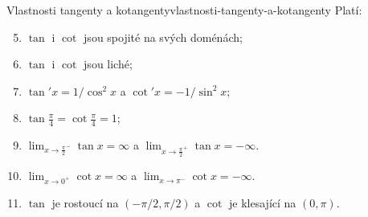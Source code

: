 \begin{proposition}{Vlastnosti tangenty a kotangenty}{vlastnosti-tangenty-a-kotangenty}
 Platí:
 \begin{enumerate}[label=(G\arabic*)]
  \setcounter{enumi}{4}
  \item $\tan$ i $\cot$ jsou spojité na svých doménách;
  \item $\tan$ i $\cot$ jsou liché;
  \item $\tan'x = 1 / \cos^2 x$ a $\cot'x = - 1 / \sin^2 x$;
  \item $\tan \frac{\pi}{4} = \cot \frac{\pi}{4} = 1$;
  \item $\lim_{x \to \frac{\pi}{2}^{-}} \tan x = \infty$ a $\lim_{x \to
   \frac{\pi}{2}^{+}} \tan x = -\infty$.
  \item $\lim_{x \to 0^{+}} \cot x = \infty$ a $\lim_{x \to \pi^{-}} \cot x =
   -\infty$.
  \item $\tan$ je rostoucí na $(-\pi / 2, \pi / 2)$ a $\cot$ je klesající na
   $(0,\pi)$.
 \end{enumerate}
\end{proposition}

